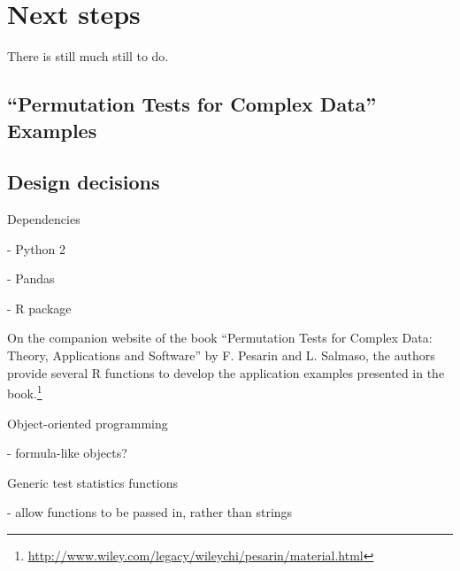 \chapter{\label{ch:nextsteps}Next steps}

There is still much still to do.

\section{\label{sec:book}``Permutation Tests for Complex Data'' Examples}

\cite{pesarin2010permutation}

%
%
%
%
%
%
%
%
%
%
%
%
%
%
%
%

\section{Design decisions}

Dependencies

- Python 2

- Pandas


- R package

On the companion website of the book ``Permutation Tests for Complex Data:
Theory, Applications and Software'' by F. Pesarin and L. Salmaso, the
authors provide several R functions to develop the application examples
presented in the book.\footnote{\url{http://www.wiley.com/legacy/wileychi/pesarin/material.html}}

Object-oriented programming

- formula-like objects?

Generic test statistics functions

- allow functions to be passed in, rather than strings
